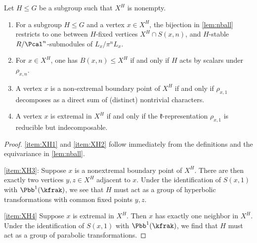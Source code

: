 \documentclass{amsart}
\begin{document}
\begin{lemma}\label{lem:XH}
	Let $H \leq G$ be a subgroup such that $X^{H}$ is nonempty.
	\begin{enumerate}
		\item\label{item:XH1} For a subgroup $H\leq G$ and a vertex $x\in X^{H}$, the bijection in \cref{lem:nball} restricts to one between $H$-fixed vertices $X^{H}\cap S(x,n)$, and  $H$-stable $R/\Pcal^{n}$-submodules of $L_{x}/\pi^{n}L_{x}$.
		\item\label{item:XH2} For $x\in X^{H}$, one has $B(x,n) \leq X^{H}$ if and only if $H$ acts by scalars under $\rho_{x,n}$.
		\item\label{item:XH3} A vertex $x$ is a non-extremal boundary point of $X^{H}$ if and only if $\rho_{x,1}$ decomposes as a direct sum of (distinct) nontrivial characters.
		\item\label{item:XH4} A vertex $x$ is extremal in $X^{H}$ if and only if the $\mathfrak{k}$-representation $\rho_{x,1}$ is reducible but indecomposable.
	\end{enumerate}
\end{lemma}
\begin{proof}
	\cref{item:XH1} and \cref{item:XH2} follow immediately from the definitions and the equivariance in \cref{lem:nball}.

	\cref{item:XH3}: Suppose $x$ is a nonextremal boundary point of $X^{H}$. There are then exactly two vertices $y,z \in X^{H}$ adjacent to $x$. Under the identification of $S(x,1)$ with $\Pbb^{1}(\kfrak)$, we see that $H$ must act as a group of hyperbolic transformations with common fixed points $y,z$.

	\cref{item:XH4} Suppose $x$ is extremal in $X^{H}$. Then $x$ has exactly one neighbor in $X^{H}$. Under the identification of $S(x,1)$ with $\Pbb^{1}(\kfrak)$, we find that $H$ must act as a group of parabolic transformations.
\end{proof}
\end{document}
